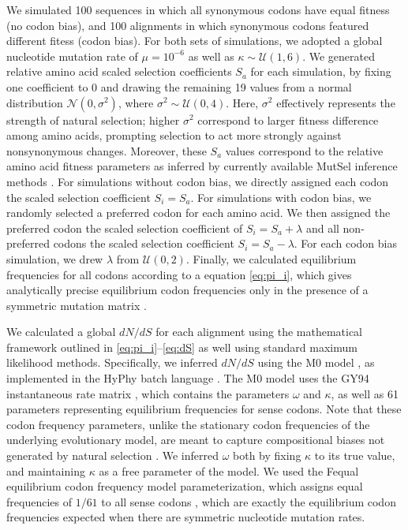 \documentclass{pnastwo}
\begin{document}
\begin{article}
We simulated 100 sequences in which all synonymous codons have equal fitness (no codon bias), and 100 alignments in which synonymous codons featured different fitess (codon bias). For both sets of simulations, we adopted a global nucleotide mutation rate of $\mu = 10^{-6}$ as well as $\kappa \sim \mathcal{U} (1,6)$. We generated relative amino acid scaled selection coefficients $S_a$ for each simulation, by fixing one coefficient to 0 and drawing the remaining 19 values from a normal distribution $\mathcal{N}(0,\sigma^2)$, where $\sigma^2 \sim \mathcal{U}(0,4)$. Here, $\sigma^2$ effectively represents the strength of natural selection; higher $\sigma^2$ correspond to larger fitness difference among amino acids, prompting selection to act more strongly against nonsynonymous changes. Moreover, these $S_a$ values correspond to the relative amino acid fitness parameters as inferred by currently available MutSel inference methods \cite{Tamurietal2014,RodrigueLartillot2014}. For simulations without codon bias, we directly assigned each codon the scaled selection coefficient $S_i = S_a$. For simulations with codon bias, we randomly selected a preferred codon for each amino acid. We then assigned the preferred codon the scaled selection coefficient of $S_i = S_a + \lambda$ and all non-preferred codons the scaled selection coefficient $S_i = S_a - \lambda$. For each codon bias simulation, we drew $\lambda$ from $\mathcal{U}(0,2)$. Finally, we calculated equilibrium frequencies for all codons according to a equation \eqref{eq:pi_i}, which gives analytically precise equilibrium codon frequencies only in the presence of a symmetric mutation matrix \cite{SellaHirsh2005}.

We calculated a global $dN/dS$ for each alignment using the mathematical framework outlined in \eqref{eq:pi_i}--\eqref{eq:dS} as well using standard maximum likelihood methods. Specifically, we inferred $dN/dS$ using the M0 model \cite{Yangetal2000}, as implemented in the HyPhy batch language \cite{KosakovskyPondetal2005}. The M0 model uses the GY94 instantaneous rate matrix \cite{GoldmanYang1994,NielsenYang1998}, which contains the parameters $\omega$ and $\kappa$, as well as 61 parameters representing equilibrium frequencies for sense codons. Note that these codon frequency parameters, unlike the stationary codon frequencies of the underlying evolutionary model, are meant to capture compositional biases not generated by natural selection \cite{GoldmanYang1994,MuseGaut1994,YN00,Yang2006}. We inferred $\omega$ both by fixing $\kappa$ to its true value, and maintaining $\kappa$ as a free parameter of the model. We used the Fequal equilibrium codon frequency model parameterization, which assigns equal frequencies of $1/61$ to all sense codons \cite{Yang2006}, which are exactly the equilibrium codon frequencies expected when there are symmetric nucleotide mutation rates.



\end{article}
\end{document}
